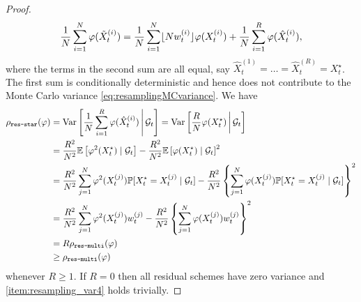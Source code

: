 \begin{proof}
\begin{equation*}
\frac{1}{N} \sum_{i=1}^N \varphi (\tilde{X}_t^{(i)})
= \frac{1}{N} \sum_{i=1}^N \lfloor N w_t^{(i)} \rfloor \varphi (X_t^{(i)})
        + \frac{1}{N} \sum_{i=1}^R \varphi (\hat{X}_t^{(i)}) ,
\end{equation*}
where the terms in the second sum are all equal, say $\hat{X}_t^{(1)} = \dots = \hat{X}_t^{(R)} = X_t^\star$.
The first sum is conditionally deterministic and hence does not contribute to the Monte Carlo variance \eqref{eq:resamplingMCvariance}.
We have
\begin{align*}
\rho_{\texttt{res-star}}(\varphi)
&= \operatorname{Var}\left[ \frac{1}{N} \sum_{i=1}^R \varphi (\hat{X}_t^{(i)}) \,\middle|\, \mathcal{G}_t \right] 
= \operatorname{Var}\left[ \frac{R}{N} \varphi (X_t^\star) \,\middle|\, \mathcal{G}_t \right] \\
&= \frac{R^2}{N^2} \mathbb{E}\left[ \varphi^2( X_t^\star) \mid \mathcal{G}_t \right]
        - \frac{R^2}{N^2} \mathbb{E}\left[ \varphi( X_t^\star) \mid \mathcal{G}_t \right]^2 \\
&= \frac{R^2}{N^2} \sum_{j=1}^N \varphi^2(X_t^{(j)}) 
        \mathbb{P}[ X_t^\star = X_t^{(j)} \mid \mathcal{G}_t ]
        - \frac{R^2}{N^2} \left\{ \sum_{j=1}^N \varphi(X_t^{(j)}) 
        \mathbb{P}[ X_t^\star = X_t^{(j)} \mid \mathcal{G}_t ] \right\}^2 \\
&= \frac{R^2}{N^2} \sum_{j=1}^N \varphi^2(X_t^{(j)}) w_t^{(j)}
        - \frac{R^2}{N^2} \left\{ \sum_{j=1}^N \varphi(X_t^{(j)}) w_t^{(j)} \right\}^2 \\
&= R \rho_{\texttt{res-multi}}(\varphi) \\
&\geq \rho_{\texttt{res-multi}}(\varphi) 
\end{align*}
whenever $R\geq 1$. 
If $R=0$ then all residual schemes have zero variance and \ref{item:resampling_var4} holds trivially.
\end{proof}


